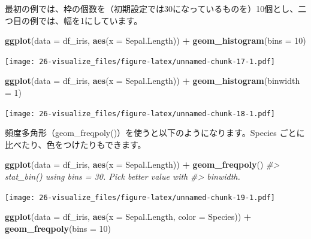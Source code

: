 \documentclass[
  xelatex, ja=standard]{bxjsbook}
\newenvironment{Shaded}{\begin{snugshade}}{\end{snugshade}}
\newcommand{\AttributeTok}[1]{\textcolor[rgb]{0.13,0.29,0.53}{#1}}
\newcommand{\CommentTok}[1]{\textcolor[rgb]{0.56,0.35,0.01}{\textit{#1}}}
\newcommand{\DecValTok}[1]{\textcolor[rgb]{0.00,0.00,0.81}{#1}}
\newcommand{\FunctionTok}[1]{\textcolor[rgb]{0.13,0.29,0.53}{\textbf{#1}}}
\newcommand{\NormalTok}[1]{#1}
\newcommand{\SpecialCharTok}[1]{\textcolor[rgb]{0.81,0.36,0.00}{\textbf{#1}}}
\theoremstyle{definition}
\theoremstyle{definition}
\theoremstyle{definition}
\theoremstyle{definition}
\theoremstyle{remark}
\begin{document}
最初の例では、枠の個数を（初期設定では30になっているものを）10個とし、二つ目の例では、幅を1にしています。

\begin{Shaded}
\begin{Highlighting}[]
\FunctionTok{ggplot}\NormalTok{(}\AttributeTok{data =}\NormalTok{ df\_iris, }\FunctionTok{aes}\NormalTok{(}\AttributeTok{x =}\NormalTok{ Sepal.Length)) }\SpecialCharTok{+}
  \FunctionTok{geom\_histogram}\NormalTok{(}\AttributeTok{bins =} \DecValTok{10}\NormalTok{)}
\end{Highlighting}
\end{Shaded}

\texttt{[image: 26-visualize\_files/figure-latex/unnamed-chunk-17-1.pdf]}

\begin{Shaded}
\begin{Highlighting}[]
\FunctionTok{ggplot}\NormalTok{(}\AttributeTok{data =}\NormalTok{ df\_iris, }\FunctionTok{aes}\NormalTok{(}\AttributeTok{x =}\NormalTok{ Sepal.Length)) }\SpecialCharTok{+}
  \FunctionTok{geom\_histogram}\NormalTok{(}\AttributeTok{binwidth =} \DecValTok{1}\NormalTok{)}
\end{Highlighting}
\end{Shaded}

\texttt{[image: 26-visualize\_files/figure-latex/unnamed-chunk-18-1.pdf]}

頻度多角形（geom\_freqpoly()）を使うと以下のようになります。Species ごとに比べたり、色をつけたりもできます。

\begin{Shaded}
\begin{Highlighting}[]
\FunctionTok{ggplot}\NormalTok{(}\AttributeTok{data =}\NormalTok{ df\_iris, }\FunctionTok{aes}\NormalTok{(}\AttributeTok{x =}\NormalTok{ Sepal.Length)) }\SpecialCharTok{+}
  \FunctionTok{geom\_freqpoly}\NormalTok{()}
\CommentTok{\#\textgreater{} \textasciigrave{}stat\_bin()\textasciigrave{} using \textasciigrave{}bins = 30\textasciigrave{}. Pick better value with}
\CommentTok{\#\textgreater{} \textasciigrave{}binwidth\textasciigrave{}.}
\end{Highlighting}
\end{Shaded}

\texttt{[image: 26-visualize\_files/figure-latex/unnamed-chunk-19-1.pdf]}

\begin{Shaded}
\begin{Highlighting}[]
\FunctionTok{ggplot}\NormalTok{(}\AttributeTok{data =}\NormalTok{ df\_iris, }\FunctionTok{aes}\NormalTok{(}\AttributeTok{x =}\NormalTok{ Sepal.Length, }\AttributeTok{color =}\NormalTok{ Species)) }\SpecialCharTok{+}
  \FunctionTok{geom\_freqpoly}\NormalTok{(}\AttributeTok{bins =} \DecValTok{10}\NormalTok{)}
\end{Highlighting}
\end{Shaded}
\end{document}
